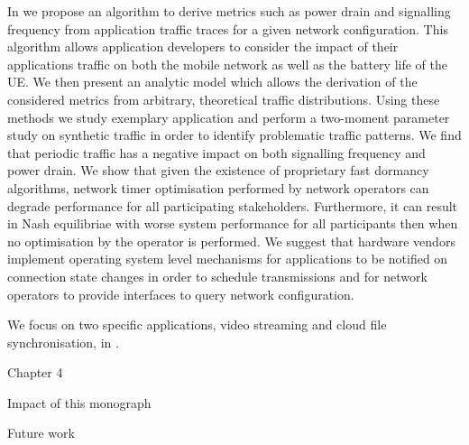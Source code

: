 In  we propose an algorithm to derive metrics such as power drain and signalling frequency from application traffic traces for a given network configuration.
This algorithm allows application developers to consider the impact of their applications traffic on both the mobile network as well as the battery life of the \gls{UE}.
We then present an analytic model which allows the derivation of the considered metrics from arbitrary, theoretical traffic distributions.
Using these methods we study exemplary application and perform a two-moment parameter study on synthetic traffic in order to identify problematic traffic patterns.
We find that periodic traffic has a negative impact on both signalling frequency and power drain.
We show that given the existence of proprietary fast dormancy algorithms, network timer optimisation performed by network operators can degrade performance for all participating stakeholders. 
Furthermore, it can result in Nash equilibriae with worse system performance for all participants then when no optimisation by the operator is performed.  
We suggest that hardware vendors implement operating system level mechanisms for applications to be notified on connection state changes in order to schedule transmissions and for network operators to provide interfaces to query network configuration.

We focus on two specific applications, video streaming and cloud file synchronisation, in .

Chapter 4

Impact of this monograph

Future work